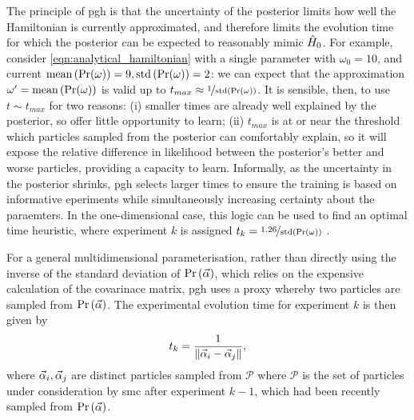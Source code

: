 The principle of \gls{pgh} is that the uncertainty of the posterior limits how well the Hamiltonian is currently 
    approximated, and therefore limits the evolution time for which the posterior can be expected to 
    reasonably mimic $\hat{H}_0$\footnotemark.
For example, consider \cref{eqn:analytical_hamiltonian} with a single parameter with $\omega_0 = 10$,
    and current $\textrm{mean}\left(\Pr(\omega)\right) = 9, \textrm{std}\left(\Pr(\omega)\right) = 2$:
    we can expect that the approximation $\omega^{\prime} = \textrm{mean}\left(\Pr(\omega)\right)$ 
    is valid up to $t_{max} \approx \nicefrac{1}{\textrm{std}\left(\Pr(\omega)\right)}$. 
It is sensible, then, to use $t \sim t_{max}$ for two reasons: 
    (i) smaller times are already well explained by the posterior, so offer little opportunity to learn;
    (ii) $t_{max}$ is at or near the threshold which \glspl{particle} sampled from the posterior can comfortably explain, 
        so it will expose the relative difference in \gls{likelihood} between the posterior's better and worse \glspl{particle}, 
        providing a capacity to learn. 
Informally, as the uncertainty in the posterior shrinks, \gls{pgh} selects larger times 
    to ensure the training is based on informative eperiments while 
    simultaneously increasing certainty about the paraemters. 
In the one-dimensional case, this logic can be used to find an optimal time heuristic, 
    where experiment $k$ is assigned $t_k = \nicefrac{1.26}{\textrm{std}\left(\Pr(\omega)\right)}$ \cite{ferrie2013best}. 
\par
For a general multidimensional parameterisation, 
    rather than directly using the inverse of the standard deviation of $\Pr \left(\vec{\alpha}\right)$, 
    which relies on the expensive calculation of the covarinace matrix, 
    \gls{pgh} uses a proxy whereby two \glspl{particle} are sampled from $\Pr \left(\vec{\alpha}\right)$. 
The experimental evolution time for experiment $k$ is then given by 
\begin{equation}
    \label{eqn:pgh_time}
    t_k = \frac{1}{\| \vec{\alpha}_i - \vec{\alpha}_j \|}, 
\end{equation}
    where $\vec{\alpha}_i, \vec{\alpha}_j$ are distinct \glspl{particle} sampled from $\mathcal{P}$ where 
    $\mathcal{P}$ is the set of \glspl{particle} under consideration by \gls{smc} after experiment $k-1$, 
    which had been recently sampled from $\Pr\left(\vec{\alpha}\right)$. 
\par 


